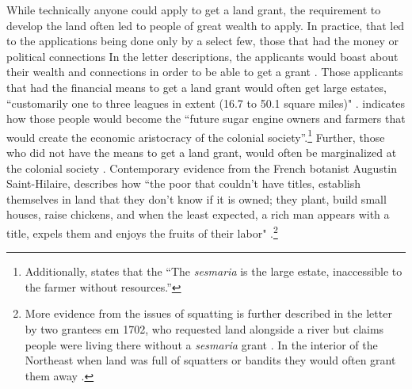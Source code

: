 \documentclass{article}
\begin{document}
While technically anyone could apply to get a land grant, the requirement to develop the land often led to people of great wealth to apply. 
In practice, that led to the applications being done only by a select few, those that had the money or political connections \parencite[p~434]{Diffie1987-bw}
In the letter descriptions, the applicants would boast about their wealth and connections in order to be able to get a grant \parencite[p.~36]{Lima1954-td}. 
Those applicants that had the financial means to get a land grant would often get large estates, ``customarily one to three leagues in extent (16.7 to 50.1 square miles)" \parencite{Dean1971-iq}.
\textcite[p.~36]{Lima1954-td} indicates how those people would become the ``future sugar engine owners and farmers that would create the economic aristocracy of the colonial society''.\footnote{Additionally, \textcite[p.~47]{Lima1954-td} states that the ``The \textit{sesmaria} is the large estate, inaccessible to the farmer without resources.''} 
Further, those who did not have the means to get a land grant, would often be marginalized at the colonial society \parencite{Simonsen2005-ps}.
Contemporary evidence from the French botanist Augustin Saint-Hilaire, describes how ``the poor that couldn't have titles, establish themselves in land that they don't know if it is owned; they plant, build small houses, raise chickens, and when the least expected, a rich man appears with a title, expels them and enjoys the fruits of their labor" \parencite[p.~143]{Da_Costa_Porto1979-dz}.\footnote{More evidence from the issues of squatting is further described in the letter by two grantees em 1702, who requested land alongside a river but claims people were living there without a \textit{sesmaria} grant \parencite[p.~142]{Da_Costa_Porto1979-dz}. In the interior of the Northeast when land was full of squatters or bandits they would often grant them away \parencite[p.~88]{Poppino1968-ab}.}

\end{document}
